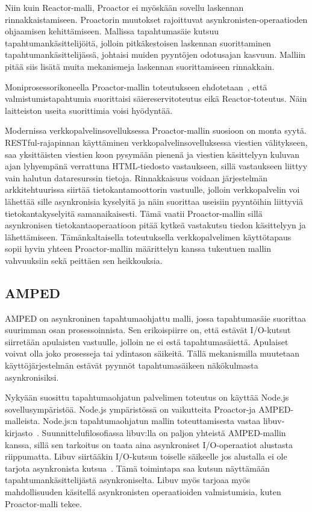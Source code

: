 \documentclass[finnish]{tktltiki2}
\theoremstyle{definition}
\theoremstyle{remark}
\begin{document}
Niin kuin Reactor-malli, Proactor ei myöskään sovellu laskennan rinnakkaistamiseen.
Proactorin muutokset rajoittuvat asynkronisten-operaatioden ohjaamisen
kehittämiseen. Mallissa tapahtumasäie kutsuu tapahtumankäsittelijöitä, jolloin
pitkäkestoisen laskennan suorittaminen tapahtumankäsittelijässä, johtaisi
muiden pyyntöjen odotusajan kasvuun. Malliin pitää siis
lisätä muita mekanismeja laskennan suorittamiseen rinnakkain.

Moniprosessorikoneella Proactor-mallin toteutukseen
ehdotetaan~\cite{pyarali_proactor_1997}, että valmistumistapahtumia suorittaisi säiereservitoteutus
eikä Reactor-toteutus. Näin laitteiston useita suorittimia voisi hyödyntää.

Modernissa verkkopalvelinsovelluksessa Proactor-mallin suosioon on
monta syytä. RESTful-rajapinnan käyttäminen
verkkopalvelinsovelluksessa viestien välitykseen,
saa yksittäisten viestien koon pysymään pienenä ja viestien
käsittelyyn kuluvan ajan lyhyempänä verrattuna
HTML-tiedosto vastaukseen, sillä
vastaukseen liittyy vain halutun dataresurssin tietoja.
Rinnakkaisuus
voidaan järjestelmän arkkitehtuurissa siirtää tietokantamoottorin vastuulle,
jolloin verkkopalvelin voi lähettää sille asynkronisia kyselyitä
ja näin suorittaa useisiin pyyntöihin liittyviä tietokantakyselyitä
samanaikaisesti. Tämä vaatii Proactor-mallin sillä asynkronisen tietokantaoperaatioon
pitää kytkeä vastakutsu tiedon käsittelyyn ja lähettämiseen.
Tämänkaltaisella toteutuksella verkkopalvelimen käyttötapaus sopii
hyvin yhteen Proactor-mallin määrittelyn kanssa tukeutuen
mallin vahvuuksiin sekä peittäen sen heikkouksia.

\subsection{AMPED}

AMPED on asynkroninen tapahtumaohjattu malli, jossa
tapahtumasäie suorittaa suurimman osan prosessoinnista. 
Sen erikoispiirre on, että estävät I/O-kutsut
siirretään apulaisten vastuulle, jolloin
ne ei estä tapahtumasäiettä. Apulaiset voivat
olla joko prosesseja tai ydintason säikeitä.
Tällä mekanismilla muutetaan käyttöjärjestelmän
estävät pyynnöt tapahtumasäikeen näkökulmasta
asynkronisiksi.

Nykyään suosittu tapahtumaohjatun palvelimen toteutus on
käyttää Node.js sovellusympäristöä. Node.js ympäristössä
on vaikutteita Proactor-ja AMPED-malleista.
Node.js:n tapahtumaohjatun mallin toteuttamisesta vastaa
libuv-kirjasto~\cite{libuv_design_2019}. Suunnittelufilosofiassa
libuv:lla on paljon yhteistä AMPED-mallin kanssa, sillä
sen tarkoitus on taata aina asynkroniset I/O-operaatiot alustasta
riippumatta. Libuv siirtääkin I/O-kutsun toiselle säikeelle
jos alustalla ei ole tarjota asynkronista kutsua~\cite{libuv_design_2019}.
Tämä toimintapa saa kutsun näyttämään tapahtumankäsittelijästä
asynkroniselta. Libuv myös tarjoaa myös mahdollisuuden
käsitellä asynkronisten operaatioiden valmistumisia, kuten 
Proactor-malli tekee.
\end{document}
